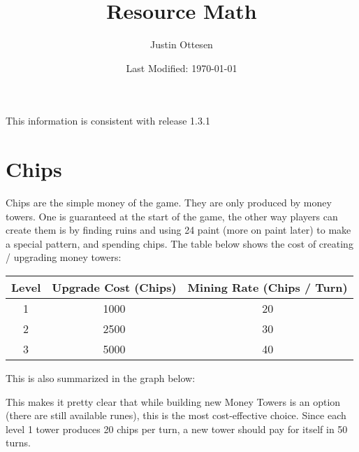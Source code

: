 \documentclass{article}
\title{Resource Math}
\author{Justin Ottesen}
\date{Last Modified: \today}
\begin{document}
  \maketitle

  This information is consistent with release 1.3.1

  \section*{Chips}

  Chips are the simple money of the game. They are only produced by money towers. One is guaranteed at the start of the game, the other way players can create them is by finding ruins and using 24 paint (more on paint later) to make a special pattern, and spending chips. The table below shows the cost of creating / upgrading money towers:
  \begin{center}
    \begin{tabular}{c | c | c}
      Level & Upgrade Cost (Chips) & Mining Rate (Chips / Turn) \\
      \hline 
      1 & 1000 & 20   \\
      2 & 2500 & 30   \\
      3 & 5000 & 40   \\
    \end{tabular}
  \end{center}
  This is also summarized in the graph below:
  \begin{center}
  \end{center}
  This makes it pretty clear that while building new Money Towers is an option (there are still available runes), this is the most cost-effective choice. Since each level 1 tower produces 20 chips per turn, a new tower should pay for itself in 50 turns.
\end{document}

